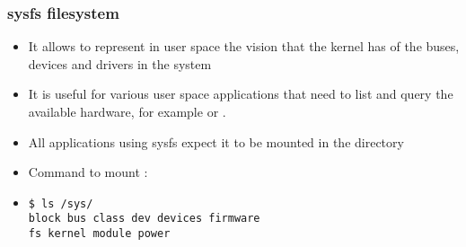 \begin{frame}[fragile]
  \frametitle{sysfs filesystem}
  \begin{itemize}
  \item It allows to represent in user space the vision that the kernel
    has of the buses, devices and drivers in the system
  \item It is useful for various user space applications that need to
    list and query the available hardware, for example  or
    .
  \item All applications using sysfs expect it to be mounted in the
     directory
  \item Command to mount :\\
  \item
\begin{verbatim}
$ ls /sys/
block bus class dev devices firmware
fs kernel module power
\end{verbatim}
  \end{itemize}
\end{frame}
